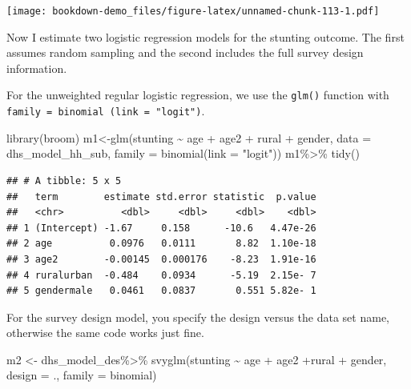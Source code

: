 \documentclass[
]{article}
\newenvironment{Shaded}{\begin{snugshade}}{\end{snugshade}}
\newcommand{\AttributeTok}[1]{\textcolor[rgb]{0.77,0.63,0.00}{#1}}
\newcommand{\FunctionTok}[1]{\textcolor[rgb]{0.00,0.00,0.00}{#1}}
\newcommand{\NormalTok}[1]{#1}
\newcommand{\OtherTok}[1]{\textcolor[rgb]{0.56,0.35,0.01}{#1}}
\newcommand{\SpecialCharTok}[1]{\textcolor[rgb]{0.00,0.00,0.00}{#1}}
\newcommand{\StringTok}[1]{\textcolor[rgb]{0.31,0.60,0.02}{#1}}
\begin{document}
\texttt{[image: bookdown-demo\_files/figure-latex/unnamed-chunk-113-1.pdf]}

Now I estimate two logistic regression models for the stunting outcome. The first assumes random sampling and the second includes the full survey design information.

For the unweighted regular logistic regression, we use the \texttt{glm()} function with \texttt{family\ =\ binomial\ (link\ =\ "logit")}.

\begin{Shaded}
\begin{Highlighting}[]
\FunctionTok{library}\NormalTok{(broom)}
\NormalTok{m1}\OtherTok{\textless{}{-}}\FunctionTok{glm}\NormalTok{(stunting }\SpecialCharTok{\textasciitilde{}}\NormalTok{ age }\SpecialCharTok{+}\NormalTok{ age2 }\SpecialCharTok{+}\NormalTok{ rural }\SpecialCharTok{+}\NormalTok{ gender,}
              \AttributeTok{data =}\NormalTok{ dhs\_model\_hh\_sub,}
              \AttributeTok{family =} \FunctionTok{binomial}\NormalTok{(}\AttributeTok{link =} \StringTok{"logit"}\NormalTok{))}
\NormalTok{m1}\SpecialCharTok{\%\textgreater{}\%}
  \FunctionTok{tidy}\NormalTok{()}
\end{Highlighting}
\end{Shaded}

\begin{verbatim}
## # A tibble: 5 x 5
##   term        estimate std.error statistic  p.value
##   <chr>          <dbl>     <dbl>     <dbl>    <dbl>
## 1 (Intercept) -1.67     0.158      -10.6   4.47e-26
## 2 age          0.0976   0.0111       8.82  1.10e-18
## 3 age2        -0.00145  0.000176    -8.23  1.91e-16
## 4 ruralurban  -0.484    0.0934      -5.19  2.15e- 7
## 5 gendermale   0.0461   0.0837       0.551 5.82e- 1
\end{verbatim}

For the survey design model, you specify the design versus the data set name, otherwise the same code works just fine.

\begin{Shaded}
\begin{Highlighting}[]
\NormalTok{m2 }\OtherTok{\textless{}{-}}\NormalTok{ dhs\_model\_des}\SpecialCharTok{\%\textgreater{}\%}
  \FunctionTok{svyglm}\NormalTok{(stunting }\SpecialCharTok{\textasciitilde{}}\NormalTok{ age }\SpecialCharTok{+}\NormalTok{ age2 }\SpecialCharTok{+}\NormalTok{rural }\SpecialCharTok{+}\NormalTok{ gender,}
         \AttributeTok{design =}\NormalTok{ .,}
         \AttributeTok{family =}\NormalTok{ binomial)}
\end{Highlighting}
\end{Shaded}
\end{document}
